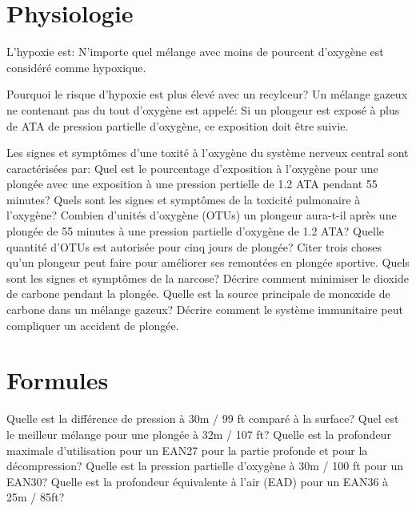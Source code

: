 \documentclass[english,10pt,a4paper]{article}
\begin{document}
	\section{Physiologie}
	\begin{outline}
		\1 L'hypoxie est:			
		\1 N'importe quel mélange avec moins de \underline{\hspace{1.5cm}} pourcent d'oxygène est considéré comme hypoxique.

		\1 Pourquoi le risque d'hypoxie est plus élevé avec un recylceur?
		\1 Un mélange gazeux ne contenant pas du tout d'oxygène est appelé:
		\1 Si un plongeur est exposé à plus de \underline{\hspace{1.5cm}} ATA de pression partielle d'oxygène, ce exposition doit être suivie.

		\1 Les signes et symptômes d'une toxité à l'oxygène du système nerveux central sont caractérisées par:
		\1 Quel est le pourcentage d'exposition à l'oxygène pour une plongée avec une exposition à une pression pertielle de 1.2 ATA pendant 55 minutes?
		\1 Quels sont les signes et symptômes de la toxicité pulmonaire à l'oxygène?
		\1 Combien d'unités d'oxygène (OTUs) un plongeur aura-t-il après une\\plongée de 55 minutes à une pression partielle d'oxygène de 1.2 ATA?
		\1 Quelle quantité d'OTUs est autorisée pour cinq jours de plongée?
		\1 Citer trois choses qu'un plongeur peut faire pour améliorer ses remontées en plongée sportive.
		\1 Quels sont les signes et symptômes de la narcose?
		\1 Décrire comment minimiser le dioxide de carbone pendant la plongée.
		\1 Quelle est la source principale de monoxide de carbone dans un mélange gazeux?
		\1 Décrire comment le système immunitaire peut compliquer un accident de plongée.
	\end{outline}
	\pagebreak

	\section{Formules}
	\begin{outline}
		\1 Quelle est la différence de pression à 30m / 99 ft comparé à la surface?
		\1 Quel est le meilleur mélange pour une plongée à 32m / 107 ft?
		\1 Quelle est la profondeur maximale d'utilisation pour un EAN27 pour la partie profonde et pour la décompression?
		\1 Quelle est la pression partielle d'oxygène à 30m / 100 ft pour un EAN30?
		\1 Quelle est la profondeur équivalente à l'air (EAD) pour un EAN36 à 25m / 85ft?
	\end{outline}
	\pagebreak
\end{document}
